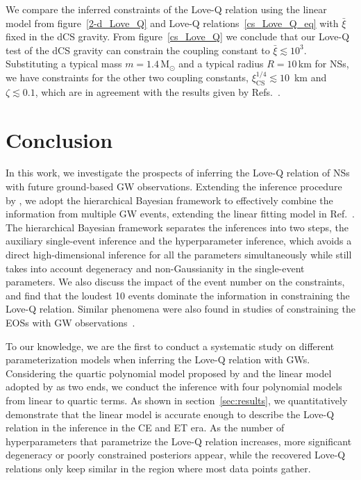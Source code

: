 \documentclass[a4paper,11pt]{article}
\begin{document}
We compare the inferred constraints of the Love-Q relation using the linear
model from figure~\ref{2-d_Love_Q} and Love-Q relations~\eqref{cs_Love_Q_eq}
with $\bar{\xi}$ fixed in the dCS gravity. From figure~\ref{cs_Love_Q} we
conclude that our Love-Q test of the dCS gravity can constrain the coupling
constant to  $\bar{\xi} \lesssim 10^{3}$. Substituting a typical mass
$m=1.4\,\mathrm{M_{\odot}}$ and a typical radius $R=10$\,km for NSs, we have
constraints for the other two coupling constants, $\xi_{\mathrm{CS}}^{1/4}
\lesssim 10$~km and $\zeta \lesssim 0.1$, which are in agreement with the
results given by Refs.~\cite{Yagi:2013bca, Yagi:2013awa}. 

\section{Conclusion}
\label{sec:conclusion}

In this work, we investigate the prospects of inferring the Love-Q relation of
NSs with future ground-based GW observations.  Extending the inference procedure
by \citet{Samajdar:2020xrd}, we adopt the hierarchical Bayesian framework to
effectively combine the information from multiple GW events, extending the
linear fitting model in Ref.~\cite{Samajdar:2020xrd}. The hierarchical Bayesian
framework separates the inferences into two steps, the auxiliary single-event
inference and the hyperparameter inference, which avoids a direct
high-dimensional inference for all the parameters simultaneously while still
takes into account degeneracy and non-Gaussianity in the single-event
parameters. We also discuss the impact of the event number on the constraints,
and find that the loudest 10 events dominate the information in constraining the
Love-Q relation. Similar phenomena were also found in studies of constraining
the EOSs with GW observations~\cite{Lackey:2014fwa, Landry:2020vaw,
Pang:2020ilf, Finstad:2022oni, Bandopadhyay:2024zrr, Wang:2024xon}.

To our knowledge, we are the first to conduct a systematic study on different
parameterization models when inferring the Love-Q relation with GWs. Considering
the quartic polynomial model proposed by \citet{Yagi:2013awa} and the linear
model adopted by \citet{Samajdar:2020xrd} as two ends, we conduct the inference
with four polynomial models from linear to quartic terms. As shown in 
section~\ref{sec:results}, we quantitatively demonstrate that the linear model
is accurate enough to describe the Love-Q relation in the inference in the CE
and ET era. As the number of hyperparameters that parametrize the Love-Q
relation increases, more significant degeneracy or poorly constrained posteriors
appear, while the recovered Love-Q relations only keep similar in the region
where most data points gather.
\end{document}
